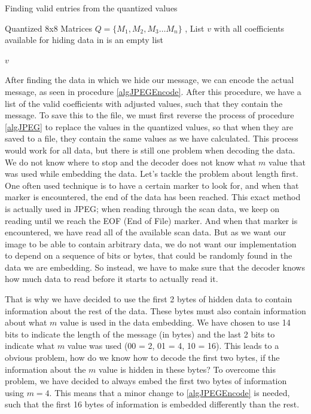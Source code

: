 \begin{algorithm}
\caption{Finding valid entries from the quantized values}
\label{algJPEG}
\begin{algorithmic}
\REQUIRE Quantized 8x8 Matrices $Q = \{ M_1, M_2, M_3 \ldots M_n \}$ ,
\ENSURE List $v$ with all coefficients available for hiding data in
 is an empty list

			\ENDIF
		\ENDFOR
	\ENDFOR
\ENDFOR

\RETURN $v$
\end{algorithmic}
\end{algorithm}

After finding the data in which we hide our message, we can encode the actual message, as seen in procedure \ref{algJPEGEncode}. 
After this procedure, we have a list of the valid coefficients with adjusted values, such that they contain the message. 
To save this to the file, we must first reverse the process of procedure \ref{algJPEG} to replace the values in the quantized values, so that when they are saved to a file, they contain the same values as we have calculated. 
This process would work for all data, but there is still one problem when decoding the data. We do not know where to stop and the decoder does not know what $m$ value that was used while embedding the data. 
Let's tackle the problem about length first. 
One often used technique is to have a certain marker to look for, and when that marker is encountered, the end of the data has been reached. 
This exact method is actually used in JPEG; when reading through the scan data, we keep on reading until we reach the EOF (End of File) marker. 
And when that marker is encountered, we have read all of the available scan data. 
But as we want our image to be able to contain arbitrary data, we do not want our implementation to depend on a sequence of bits or bytes, that could be randomly found in the data we are embedding. 
So instead, we have to make sure that the decoder knows how much data to read before it starts to actually read it. 

That is why we have decided to use the first 2 bytes of hidden data to contain information about the rest of the data. 
These bytes must also contain information about what $m$ value is used in the data embedding. 
We have chosen to use 14 bits to indicate the length of the message (in bytes) and the last 2 bits to indicate what $m$ value was used (00 = 2, 01 = 4, 10 = 16). 
This leads to a obvious problem, how do we know how to decode the first two bytes, if the information about the $m$ value is hidden in these bytes? To overcome this problem, we have decided to always embed the first two bytes of information using $m = 4$. 
This means that a minor change to \ref{algJPEGEncode} is needed, such that the first 16 bytes of information is embedded differently than the rest.

